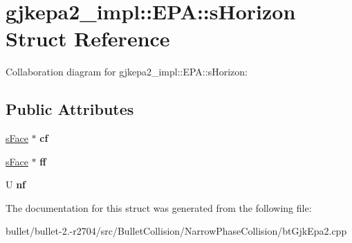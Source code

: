 \hypertarget{structgjkepa2__impl_1_1_e_p_a_1_1s_horizon}{\section{gjkepa2\+\_\+impl\+:\+:E\+P\+A\+:\+:s\+Horizon Struct Reference}
\label{structgjkepa2__impl_1_1_e_p_a_1_1s_horizon}
}


Collaboration diagram for gjkepa2\+\_\+impl\+:\+:E\+P\+A\+:\+:s\+Horizon\+:
\subsection*{Public Attributes}
\begin{DoxyCompactItemize}
\item 
\hypertarget{structgjkepa2__impl_1_1_e_p_a_1_1s_horizon_a7c99c9a25b25fe45e7789bea49e3c863}{\hyperlink{structgjkepa2__impl_1_1_e_p_a_1_1s_face}{s\+Face} $\ast$ {\bfseries cf}}\label{structgjkepa2__impl_1_1_e_p_a_1_1s_horizon_a7c99c9a25b25fe45e7789bea49e3c863}

\item 
\hypertarget{structgjkepa2__impl_1_1_e_p_a_1_1s_horizon_adbcd006a25dfd9a3057d51b0839f0488}{\hyperlink{structgjkepa2__impl_1_1_e_p_a_1_1s_face}{s\+Face} $\ast$ {\bfseries ff}}\label{structgjkepa2__impl_1_1_e_p_a_1_1s_horizon_adbcd006a25dfd9a3057d51b0839f0488}

\item 
\hypertarget{structgjkepa2__impl_1_1_e_p_a_1_1s_horizon_a2a65f3e810f41fa36e15c36eeb0f83c3}{U {\bfseries nf}}\label{structgjkepa2__impl_1_1_e_p_a_1_1s_horizon_a2a65f3e810f41fa36e15c36eeb0f83c3}

\end{DoxyCompactItemize}


The documentation for this struct was generated from the following file\+:\begin{DoxyCompactItemize}
\item 
bullet/bullet-\/2.-\/r2704/src/\+Bullet\+Collision/\+Narrow\+Phase\+Collision/bt\+Gjk\+Epa2.\+cpp\end{DoxyCompactItemize}
